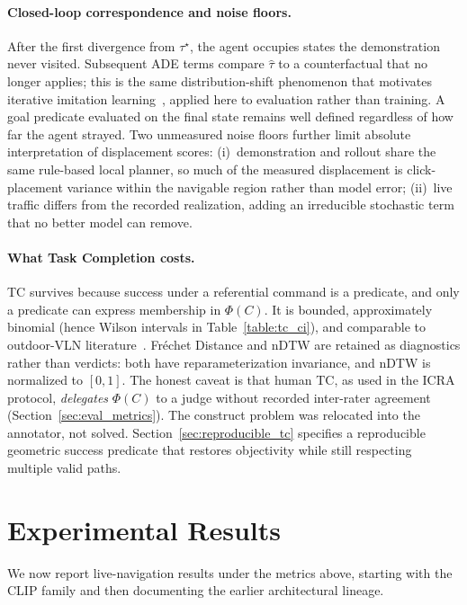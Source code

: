 \paragraph{Closed-loop correspondence and noise floors.}
After the first divergence from $\tau^\star$, the agent occupies states the demonstration never visited. Subsequent ADE terms compare $\hat{\tau}$ to a counterfactual that no longer applies; this is the same distribution-shift phenomenon that motivates iterative imitation learning~\cite{ross2011dagger}, applied here to evaluation rather than training. A goal predicate evaluated on the final state remains well defined regardless of how far the agent strayed. Two unmeasured noise floors further limit absolute interpretation of displacement scores: (i)~demonstration and rollout share the same rule-based local planner, so much of the measured displacement is click-placement variance within the navigable region rather than model error; (ii)~live traffic differs from the recorded realization, adding an irreducible stochastic term that no better model can remove.

\paragraph{What Task Completion costs.}
TC survives because success under a referential command is a predicate, and only a predicate can express membership in $\Phi(C)$. It is bounded, approximately binomial (hence Wilson intervals in Table~\ref{table:tc_ci}), and comparable to outdoor-VLN literature~\cite{schumann-riezler-2022-analyzing,xiang-etal-2020-learning,Chen2019TOUCHDOWN}. Fr\'{e}chet Distance and nDTW are retained as diagnostics rather than verdicts: both have reparameterization invariance, and nDTW is normalized to $[0,1]$. The honest caveat is that human TC, as used in the ICRA protocol, \emph{delegates} $\Phi(C)$ to a judge without recorded inter-rater agreement (Section~\ref{sec:eval_metrics}). The construct problem was relocated into the annotator, not solved. Section~\ref{sec:reproducible_tc} specifies a reproducible geometric success predicate that restores objectivity while still respecting multiple valid paths.

\section{Experimental Results}

We now report live-navigation results under the metrics above, starting with the CLIP family and then documenting the earlier architectural lineage.

